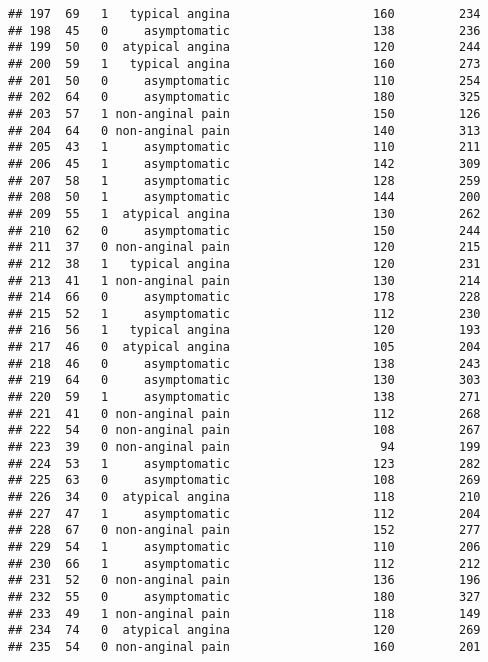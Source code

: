 \documentclass[]{article}
\begin{document}
\begin{verbatim}
## 197  69   1   typical angina                    160         234
## 198  45   0     asymptomatic                    138         236
## 199  50   0  atypical angina                    120         244
## 200  59   1   typical angina                    160         273
## 201  50   0     asymptomatic                    110         254
## 202  64   0     asymptomatic                    180         325
## 203  57   1 non-anginal pain                    150         126
## 204  64   0 non-anginal pain                    140         313
## 205  43   1     asymptomatic                    110         211
## 206  45   1     asymptomatic                    142         309
## 207  58   1     asymptomatic                    128         259
## 208  50   1     asymptomatic                    144         200
## 209  55   1  atypical angina                    130         262
## 210  62   0     asymptomatic                    150         244
## 211  37   0 non-anginal pain                    120         215
## 212  38   1   typical angina                    120         231
## 213  41   1 non-anginal pain                    130         214
## 214  66   0     asymptomatic                    178         228
## 215  52   1     asymptomatic                    112         230
## 216  56   1   typical angina                    120         193
## 217  46   0  atypical angina                    105         204
## 218  46   0     asymptomatic                    138         243
## 219  64   0     asymptomatic                    130         303
## 220  59   1     asymptomatic                    138         271
## 221  41   0 non-anginal pain                    112         268
## 222  54   0 non-anginal pain                    108         267
## 223  39   0 non-anginal pain                     94         199
## 224  53   1     asymptomatic                    123         282
## 225  63   0     asymptomatic                    108         269
## 226  34   0  atypical angina                    118         210
## 227  47   1     asymptomatic                    112         204
## 228  67   0 non-anginal pain                    152         277
## 229  54   1     asymptomatic                    110         206
## 230  66   1     asymptomatic                    112         212
## 231  52   0 non-anginal pain                    136         196
## 232  55   0     asymptomatic                    180         327
## 233  49   1 non-anginal pain                    118         149
## 234  74   0  atypical angina                    120         269
## 235  54   0 non-anginal pain                    160         201

\end{verbatim}
\end{document}
